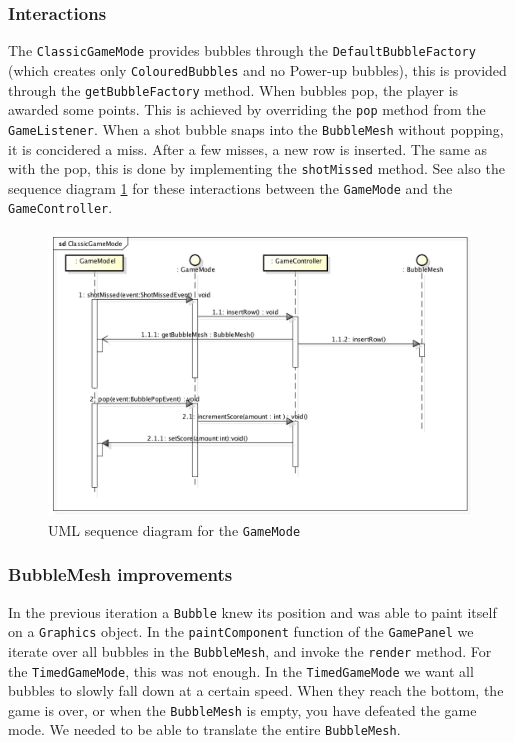 \documentclass[a4paper]{article}
\begin{document}
\subsubsection*{Interactions}
The \texttt{ClassicGameMode} provides bubbles through the \texttt{DefaultBubbleFactory} (which creates only \texttt{ColouredBubbles} and no Power-up bubbles), this is provided through the \texttt{getBubbleFactory} method. When bubbles pop, the player is awarded some points. This is achieved by overriding the \texttt{pop} method from the \texttt{GameListener}. When a shot bubble snaps into the \texttt{BubbleMesh} without popping, it is concidered a miss. After a few misses, a new row is inserted. The same as with the pop, this is done by implementing the \texttt{shotMissed} method. See also the sequence diagram \ref{fig:seqgamemode} for these interactions between the \texttt{GameMode} and the \texttt{GameController}.

\begin{figure}[H]
	\centering
	\includegraphics[scale=0.5]{ClassicGameMode.png}
    \caption{UML sequence diagram for the \texttt{GameMode}}
    \label{fig:seqgamemode}
\end{figure}

\subsubsection{BubbleMesh improvements}
In the previous iteration a \texttt{Bubble} knew its position and was able to paint itself on a \texttt{Graphics} object. In the \texttt{paintComponent} function of the \texttt{GamePanel} we iterate over all bubbles in the \texttt{BubbleMesh}, and invoke the \texttt{render} method.
For the \texttt{TimedGameMode}, this was not enough. In the \texttt{TimedGameMode} we want all bubbles to slowly fall down at a certain speed. When they reach the bottom, the game is over, or when the \texttt{BubbleMesh} is empty, you have defeated the game mode. We needed to be able to translate the entire \texttt{BubbleMesh}.
\end{document}
